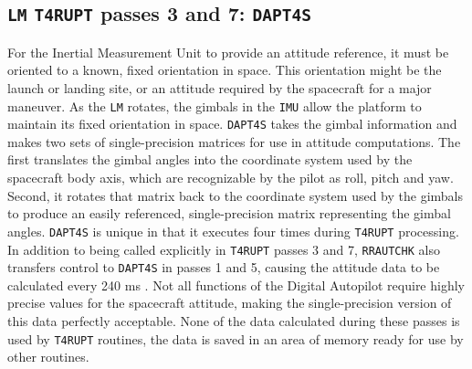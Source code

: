 \documentclass[refcap, oxford]{ahsan}
\begin{document}
\subsection{\texttt{LM} \texttt{T4RUPT} passes 3 and 7: \texttt{DAPT4S}}
For the Inertial Measurement Unit to provide an attitude reference, it must be oriented to a known, fixed orientation in space. This orientation might be the launch or landing site, or an attitude required by the spacecraft for a major maneuver. As the \texttt{LM} rotates, the gimbals in the \texttt{IMU} allow the platform to maintain its fixed orientation in space. \texttt{DAPT4S} takes the gimbal information and makes two sets of single-precision matrices for use in attitude computations. The first translates the gimbal angles into the coordinate system used by the spacecraft body axis, which are recognizable by the pilot as roll, pitch and yaw. Second, it rotates that matrix back to the coordinate system used by the gimbals to produce an easily referenced, single-precision matrix representing the gimbal angles. \texttt{DAPT4S} is unique in that it executes four times during \texttt{T4RUPT} processing. In addition to being called explicitly in \texttt{T4RUPT} passes 3 and 7, \texttt{RRAUTCHK} also transfers control to \texttt{DAPT4S} in passes 1 and 5, causing the attitude data to be calculated every 240 ms . Not all functions of the Digital Autopilot require highly precise values for the spacecraft attitude, making the single-precision version of this data perfectly acceptable. None of the data calculated during these passes is used by \texttt{T4RUPT} routines, the data is saved in an area of memory ready for use by other routines.
\end{document}

